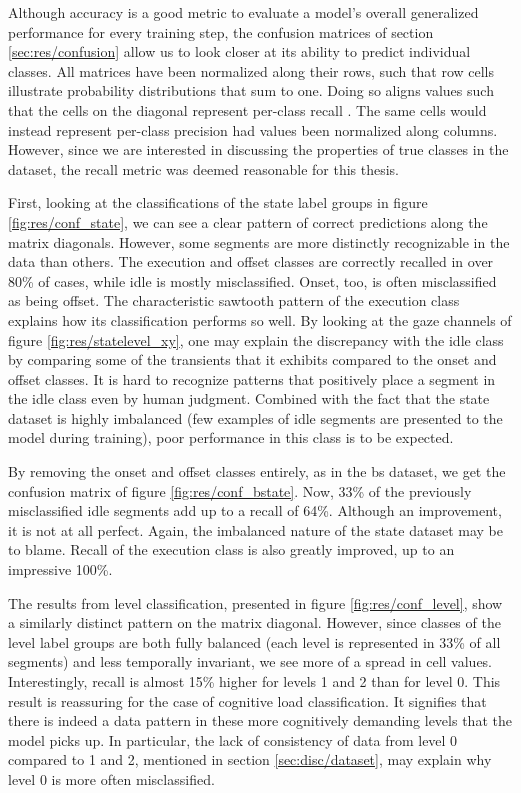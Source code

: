 Although accuracy is a good metric to evaluate a model's overall generalized performance for every training step, the confusion matrices of section \ref{sec:res/confusion} allow us to look closer at its ability to predict individual classes. All matrices have been normalized along their rows, such that row cells illustrate probability distributions that sum to one. Doing so aligns values such that the cells on the diagonal represent per-class recall
. The same cells would instead represent per-class precision had values been normalized along columns. However, since we are interested in discussing the properties of true classes in the dataset, the recall metric was deemed reasonable for this thesis.

First, looking at the classifications of the state label groups in figure \ref{fig:res/conf_state}, we can see a clear pattern of correct predictions along the matrix diagonals. However, some segments are more distinctly recognizable in the data than others. The execution and offset classes are correctly recalled in over 80\% of cases, while idle is mostly misclassified. Onset, too, is often misclassified as being offset. The characteristic sawtooth pattern of the execution class explains how its classification performs so well. By looking at the gaze channels of figure \ref{fig:res/statelevel_xy}, one may explain the discrepancy with the idle class by comparing some of the transients that it exhibits compared to the onset and offset classes. It is hard to recognize patterns that positively place a segment in the idle class even by human judgment. Combined with the fact that the state dataset is highly imbalanced (few examples of idle segments are presented to the model during training), poor performance in this class is to be expected.

By removing the onset and offset classes entirely, as in the \acrshort{bs} dataset, we get the confusion matrix of figure \ref{fig:res/conf_bstate}. Now, 33\% of the previously misclassified idle segments add up to a recall of 64\%. Although an improvement, it is not at all perfect. Again, the imbalanced nature of the state dataset may be to blame. Recall of the execution class is also greatly improved, up to an impressive 100\%.

The results from level classification, presented in figure \ref{fig:res/conf_level}, show a similarly distinct pattern on the matrix diagonal. However, since classes of the level label groups are both fully balanced (each level is represented in 33\% of all segments) and less temporally invariant, we see more of a spread in cell values. Interestingly, recall is almost 15\% higher for levels 1 and 2 than for level 0. This result is reassuring for the case of cognitive load classification. It signifies that there is indeed a data pattern in these more cognitively demanding levels that the model picks up. In particular, the lack of consistency of data from level 0 compared to 1 and 2, mentioned in section \ref{sec:disc/dataset}, may explain why level 0 is more often misclassified. 



